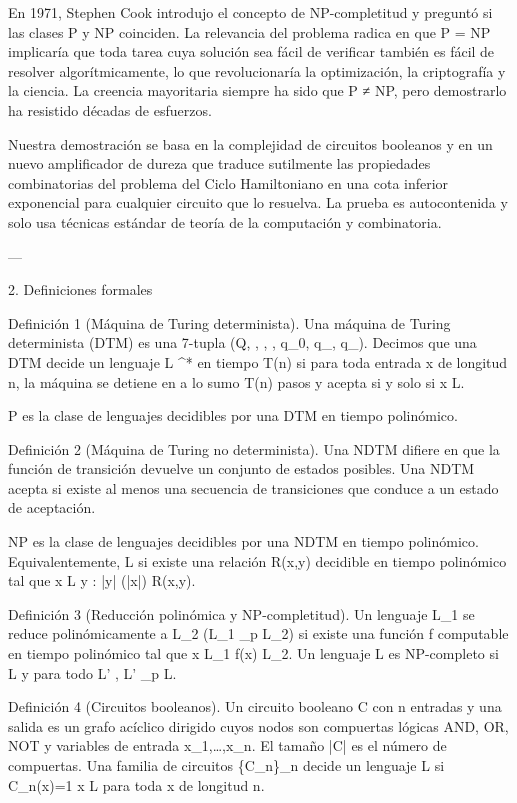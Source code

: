 \documentclass[12pt,twoside]{book}
\begin{document}
En 1971, Stephen Cook introdujo el concepto de NP-completitud y preguntó si las clases P y NP coinciden. La relevancia del problema radica en que P = NP implicaría que toda tarea cuya solución sea fácil de verificar también es fácil de resolver algorítmicamente, lo que revolucionaría la optimización, la criptografía y la ciencia. La creencia mayoritaria siempre ha sido que P ≠ NP, pero demostrarlo ha resistido décadas de esfuerzos.

Nuestra demostración se basa en la complejidad de circuitos booleanos y en un nuevo amplificador de dureza que traduce sutilmente las propiedades combinatorias del problema del Ciclo Hamiltoniano en una cota inferior exponencial para cualquier circuito que lo resuelva. La prueba es autocontenida y solo usa técnicas estándar de teoría de la computación y combinatoria.

---

2. Definiciones formales

Definición 1 (Máquina de Turing determinista). Una máquina de Turing determinista (DTM) es una 7-tupla (Q, \Sigma, \Gamma, \delta, q_0, q_{}, q_{}). Decimos que una DTM decide un lenguaje L \subseteq \Sigma^* en tiempo T(n) si para toda entrada x de longitud n, la máquina se detiene en a lo sumo T(n) pasos y acepta si y solo si x \in L.

P es la clase de lenguajes decidibles por una DTM en tiempo polinómico.

Definición 2 (Máquina de Turing no determinista). Una NDTM difiere en que la función de transición \delta devuelve un conjunto de estados posibles. Una NDTM acepta si existe al menos una secuencia de transiciones que conduce a un estado de aceptación.

NP es la clase de lenguajes decidibles por una NDTM en tiempo polinómico. Equivalentemente, L \in {} si existe una relación R(x,y) decidible en tiempo polinómico tal que x \in L \iff \exists y : |y| \le {}(|x|) \land R(x,y).

Definición 3 (Reducción polinómica y NP-completitud). Un lenguaje L_1 se reduce polinómicamente a L_2 (L_1 \le_p L_2) si existe una función f computable en tiempo polinómico tal que x \in L_1 \iff f(x) \in L_2. Un lenguaje L es NP-completo si L \in {} y para todo L' \in {}, L' \le_p L.

Definición 4 (Circuitos booleanos). Un circuito booleano C con n entradas y una salida es un grafo acíclico dirigido cuyos nodos son compuertas lógicas AND, OR, NOT y variables de entrada x_1,\dots,x_n. El tamaño |C| es el número de compuertas. Una familia de circuitos \{C_n\}_{n \in {}} decide un lenguaje L si C_n(x)=1 \iff x \in L para toda x de longitud n.
\end{document}
